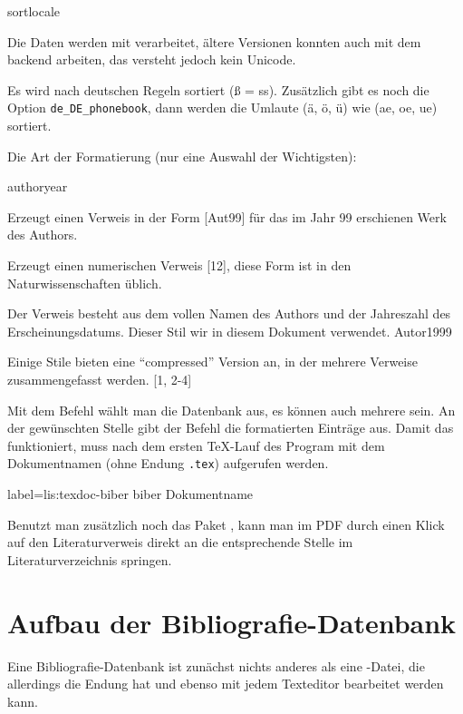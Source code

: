 \begin{labeling}{sortlocale}
\item[backend]      Die Daten werden mit \biber{} verarbeitet, 
		ältere Versionen konnten auch mit dem backend \BibTeX{} arbeiten, das versteht jedoch kein Unicode.
\item[sortlocale]   Es wird nach deutschen Regeln sortiert (ß = ss).
		Zusätzlich gibt es noch die Option \verb+de_DE_phonebook+, dann werden die Umlaute (ä, ö, ü) wie (ae, oe, ue) sortiert.
\item[style]        Die Art der Formatierung (nur eine Auswahl der Wichtigsten):
    \begin{labeling}{authoryear}
    \item [alpahbetic] Erzeugt einen Verweis in der Form [Aut99] für das im Jahr 99 erschienen Werk des Authors.
    \item [numeric]    Erzeugt einen numerischen Verweis [12], diese Form ist in den Naturwissenschaften üblich.
    \item [authoryear] Der Verweis besteht aus dem vollen Namen des Authors und der Jahreszahl des Erscheinungsdatums.
    				Dieser Stil wir in diesem Dokument verwendet. Autor1999
    \item [-comp]      Einige Stile bieten eine \enquote{compressed} Version an, in der mehrere Verweise zusammengefasst werden. [1, 2-4]
    \end{labeling}
\end{labeling}

Mit dem Befehl  wählt man die Datenbank aus, es können auch mehrere sein.
An der gewünschten Stelle gibt der Befehl  die formatierten Einträge aus.
Damit das funktioniert, 
muss nach dem ersten \TeX-Lauf des Program \biber{} mit dem Dokumentnamen (ohne Endung \texttt{.tex})
aufgerufen werden.

\begin{lfgwcode}{label={lis:texdoc-biber}}
biber Dokumentname
\end{lfgwcode}

Benutzt man zusätzlich noch das Paket , 
kann man im PDF durch einen Klick auf den Literaturverweis direkt an die entsprechende Stelle im Literaturverzeichnis springen.
 
\section{Aufbau der Bibliografie-Datenbank}\label{sec:bibliografiedatenbank}
Eine Bibliografie-Datenbank ist zunächst nichts anderes als eine -Datei,
die allerdings die Endung  hat und ebenso mit jedem Texteditor bearbeitet werden kann.

